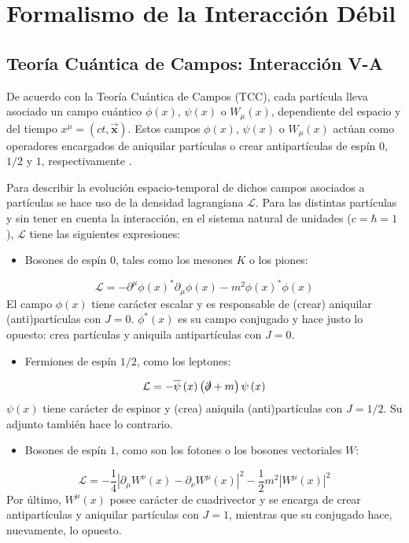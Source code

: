 \section{Formalismo de la Interacción Débil}\label{cap:formalism}
\subsection{Teoría Cuántica de Campos: Interacción V-A}\label{sec:QFT}
De acuerdo con la Teoría Cuántica de Campos (TCC), cada partícula lleva asociado un campo cuántico $\phi(x)$, $\psi(x)$ o $W_{\mu}(x)$, dependiente del espacio y del tiempo $x^{\mu}=(ct,\boldsymbol{\vec{x}})$\protect\footnotemark. Estos campos $\phi(x)$, $\psi(x)$ o $W_{\mu}(x)$ actúan como operadores encargados de aniquilar partículas o crear antipartículas de espín $0$, $1/2 $ y $1$, respectivamente \cite{notas2020}.

 
Para describir la evolución espacio-temporal de dichos campos asociados a partículas se hace uso de la densidad lagrangiana $\mathcal{L}$. Para las distintas partículas y sin tener en cuenta la interacción, en el sistema natural de unidades ($c=\hbar =1$), $\mathcal{L}$ tiene las siguientes expresiones:
\begin{itemize}
\item Bosones de espín $0$, tales como los mesones $K$ o los piones:
\end{itemize}
\begin{equation}
\mathcal{L}=-\partial ^{\mu }\phi \left( x\right) ^{\ast }\partial_{\mu} \phi \left( x\right) -m^{2}\phi \left( x\right) ^{\ast }\phi \left( x\right)
\end{equation}
El campo $\phi(x)$ tiene carácter escalar y es responsable de (crear) aniquilar (anti)partículas con $J=0$. $\phi^{\ast}(x)$ es su campo conjugado y hace justo lo opuesto: crea partículas y aniquila antipartículas con $J=0$.
\begin{itemize}
\item Fermiones de espín $1/2$, como los leptones:
\end{itemize}
\begin{equation}
\mathcal{L}=-\overline{\psi }\left( x\right) \left( \slashed{\partial}+m\right) \psi \left( x\right)
\end{equation}
$\psi(x)$ tiene carácter de espinor y (crea) aniquila (anti)partículas con $J=1/2$. Su adjunto también hace lo contrario.
\begin{itemize}
\item Bosones de espín $1$, como son los fotones o los bosones vectoriales $W$:
\end{itemize}
\begin{equation}
\mathcal{L}=-\dfrac{1}{4}\left| \partial _{\mu }W^{\nu }\left( x\right) -\partial _{\nu }W^{\mu }\left( x\right) \right| ^{2}-\dfrac{1}{2}m^{2}\left| W^{\mu }\left( x\right) \right| ^{2}
\end{equation}
Por último, $W^{\mu}(x)$ posee carácter de cuadrivector y se encarga de crear antipartículas y aniquilar partículas con $J=1$, mientras que su conjugado hace, nuevamente, lo opuesto.

